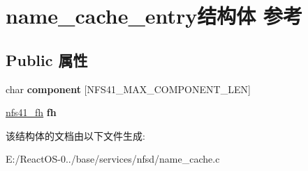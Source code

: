 \hypertarget{structname__cache__entry}{}\section{name\+\_\+cache\+\_\+entry结构体 参考}
\label{structname__cache__entry}
\subsection*{Public 属性}
\begin{DoxyCompactItemize}
\item 
\mbox{\label{structname__cache__entry_a48c2700bfdb0c5b60417c1ac5897f41a}} 
char {\bfseries component} \mbox{[}N\+F\+S41\+\_\+\+M\+A\+X\+\_\+\+C\+O\+M\+P\+O\+N\+E\+N\+T\+\_\+\+L\+EN\mbox{]}
\item 
\mbox{\label{structname__cache__entry_aaf01ba6613de1f46dc15a07f005b5e15}} 
\hyperlink{struct____nfs41__fh}{nfs41\+\_\+fh} {\bfseries fh}
\end{DoxyCompactItemize}


该结构体的文档由以下文件生成\+:\begin{DoxyCompactItemize}
\item 
E\+:/\+React\+O\+S-\/0../base/services/nfsd/name\+\_\+cache.\+c\end{DoxyCompactItemize}
